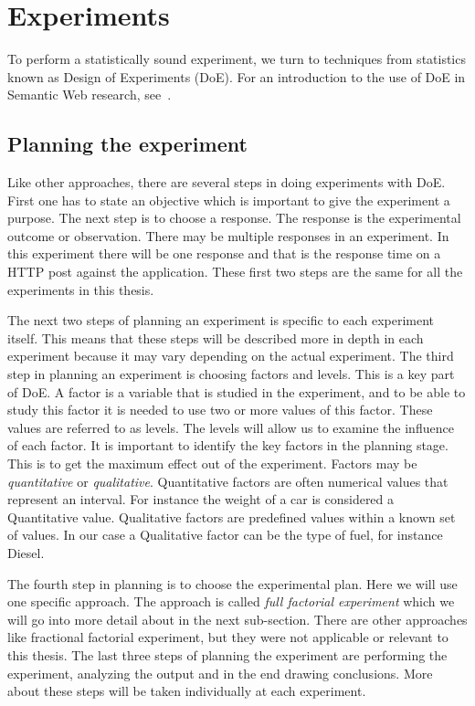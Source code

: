\documentclass{llncs}
\begin{document}
\section{Experiments}\label{Results}

To perform a statistically sound experiment, we turn to techniques
from statistics known as Design of Experiments (DoE). For an
introduction to the use of DoE in Semantic Web research, see~\cite{Kjern}.

\subsection{Planning the experiment}
Like other approaches, there are several steps in doing experiments with
DoE.  First one has to state an objective which is important to give
the experiment a purpose.  The next step is to choose a response. The
response is the experimental outcome or observation. There may be
multiple responses in an experiment. In this experiment there will be
one response and that is the response time on a HTTP post against the
application.  These first two steps are the same for all the
experiments in this thesis.

The next two steps of planning an experiment is specific to each
experiment itself. This means that these steps will be described more
in depth in each experiment because it may vary depending on the
actual experiment.  The third step in planning an experiment is
choosing factors and levels. This is a key part of DoE. A factor is a
variable that is studied in the experiment, and to be able to study
this factor it is needed to use two or more values of this
factor. These values are referred to as levels.  The levels will allow
us to examine the influence of each factor. It is important to
identify the key factors in the planning stage. This is to get the
maximum effect out of the experiment.  Factors may be
\emph{quantitative} or \emph{qualitative}. Quantitative factors
are often numerical values that represent an interval. For instance
the weight of a car is considered a Quantitative value. Qualitative
factors are predefined values within a known set of values.  In our
case a Qualitative factor can be the type of fuel, for instance
Diesel.

The fourth step in planning is to choose the experimental plan. Here
we will use one specific approach. The approach is called \emph{full
  factorial experiment} which we will go into more detail about in the
next sub-section. There are other approaches like fractional factorial
experiment, but they were not applicable or relevant to this thesis.
The last three steps of planning the experiment are performing the
experiment, analyzing the output and in the end drawing
conclusions. More about these steps will be taken individually at each
experiment.~\cite{PlanExp}
\end{document}
